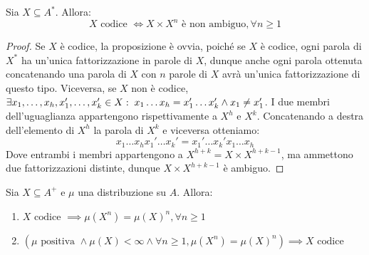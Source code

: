 \begin{proposition}[label=prop:code_iff_not_ambiguos]{}
  Sia \(X \subseteq A^*\). Allora:
  \[X \text{ codice } \iff X\times X^n \text{ è non ambiguo},\forall n \geq 1\]
\end{proposition}
\begin{proof}
  Se \(X\) è codice, la proposizione è ovvia, poiché se \(X\) è codice, ogni parola di \(X^*\) ha un'unica fattorizzazione in parole di \(X\), dunque anche ogni parola ottenuta concatenando una parola di \(X\) con \(n\) parole di \(X\) avrà un'unica fattorizzazione di questo tipo.
  Viceversa, se \(X\) non è codice, \(\exists x_1,\ldots,x_h,x_1',\ldots,x_k' \in X :\; x_1\ldots x_h = x_1'\ldots x_k' \land x_1 \neq x_1'\).
  I due membri dell'uguaglianza appartengono rispettivamente a \(X^h\) e \(X^k\).
  Concatenando a destra dell'elemento di \(X^h\) la parola di \(X^k\) e viceversa otteniamo:
  \[x_1\ldots x_h x_1'\ldots x_k' = x_1'\ldots x_k' x_1\ldots x_h\]
  Dove entrambi i membri appartengono a \(X^{h+k} = X \times X^{h+k-1}\), ma ammettono due fattorizzazioni distinte, dunque \(X \times X^{h+k-1}\) è ambiguo.
\end{proof}

\begin{proposition}[label=prop:code_implies_equal_mesures_of_powers]{}
  Sia \(X \subseteq A^+\) e \(\mu\) una distribuzione su \(A\). Allora:
  \begin{enumerate}
    \item \(X \text{ codice } \implies \mu(X^n) = {\mu(X)}^n, \forall n \geq 1\)\label{item:code_implies_measure_product}
    \item \((\mu \text{ positiva } \land \mu(X) < \infty \land \forall n \geq 1, \mu(X^n) = {\mu(X)}^n )\implies X \text{ codice}\)\label{item:measure_product_implies_code}
  \end{enumerate}
\end{proposition}

